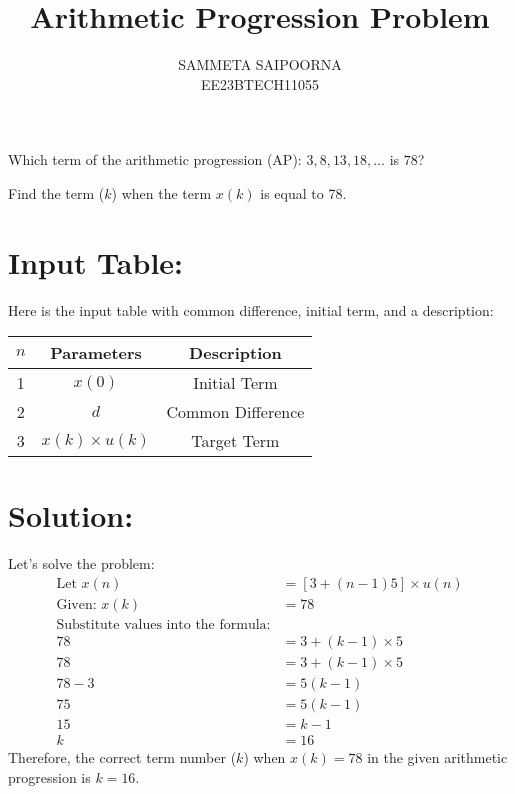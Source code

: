 \documentclass[12pt]{article}
\title{Arithmetic Progression Problem}
\author{SAMMETA SAIPOORNA \\
        EE23BTECH11055}
\date{}
\newcommand{\initialterm}{3}
\newcommand{\commondifference}{5}
\newcommand{\targetterm}{78}
\begin{document}
\maketitle

Which term of the arithmetic progression (AP): \(3, 8, 13, 18, \ldots\) is \(78\)? 

Find the term (\(k\)) when the term \(x(k)\) is equal to 78.

\section{Input Table:}
Here is the input table with common difference, initial term, and a description:

\begin{center}
\begin{tabular}{|c|c|c|}
  \hline
  \(n\) & Parameters & Description \\
  \hline
  1 & \(x(0)\) & Initial Term \\
  \hline
  2 & \(d\) & Common Difference \\
  \hline
  3 & \(x(k) \times u(k)\) & Target Term \\
  \hline
\end{tabular}
\end{center}

\section{Solution:}
Let's solve the problem:
\begin{align*}
\text{Let } x(n) &= [\initialterm + (n-1)\commondifference] \times u(n) \\
\text{Given: } x(k) &= \targetterm \\
\text{Substitute values into the formula:} \\
\targetterm &= \initialterm + (k-1) \times \commondifference \\
\targetterm &= 3 + (k-1) \times 5 \\
\targetterm - 3 &= 5(k-1) \\
75 &= 5(k-1) \\
15 &= k-1 \\
k &= 16
\end{align*}
Therefore, the correct term number (\(k\)) when \(x(k) = 78\) in the given arithmetic progression is \(k = 16\).
\end{document}
